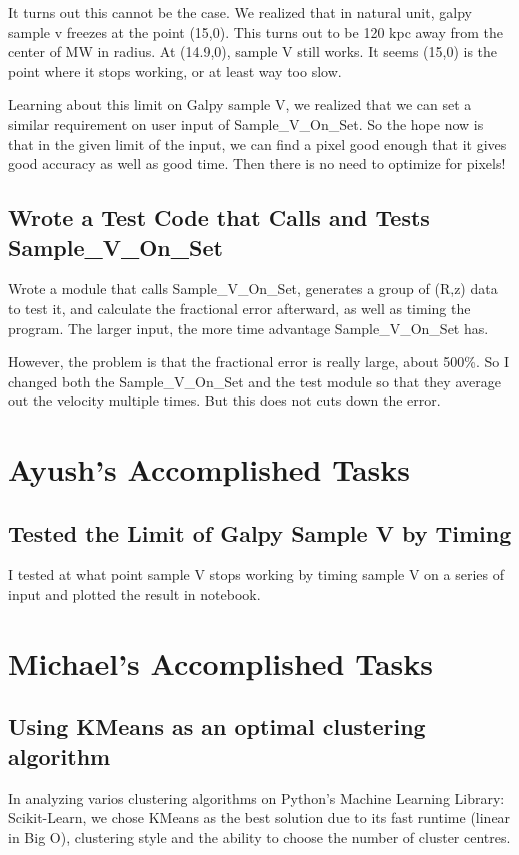 \documentclass[12pt]{article}
\begin{document}
It turns out this cannot be the case. We realized that in natural unit, galpy sample v freezes at the point (15,0). This turns out to be 120 kpc away from the center of MW in radius. At (14.9,0), sample V still works. It seems (15,0) is the point where it stops working, or at least way too slow.

Learning about this limit on Galpy sample V, we realized that we can set a similar requirement on user input of Sample\_V\_On\_Set. So the hope now is that in the given limit of the input, we can find a pixel good enough that it gives good accuracy as well as good time. Then there is no need to optimize for pixels!

\subsection{Wrote a Test Code that Calls and Tests Sample\_V\_On\_Set}
Wrote a module that calls Sample\_V\_On\_Set, generates a group of (R,z) data to test it, and calculate the fractional error afterward, as well as timing the program. The larger input, the more time advantage Sample\_V\_On\_Set has.

However, the problem is that the fractional error is really large, about 500\%.
So I changed both the Sample\_V\_On\_Set and the test module so that they average out the velocity multiple times. But this does not cuts down the error.

\section{Ayush’s Accomplished Tasks}
\subsection{Tested the Limit of Galpy Sample V by Timing}
I tested at what point sample V stops working by timing sample V on a series of input and plotted the result in notebook.

\section{Michael's Accomplished Tasks}
\subsection{Using KMeans as an optimal clustering algorithm}
In analyzing varios clustering algorithms on Python's Machine Learning Library: Scikit-Learn, we chose KMeans as the best solution due to its fast runtime (linear in Big O), clustering style and the ability to choose the number of cluster centres. 
\end{document}
